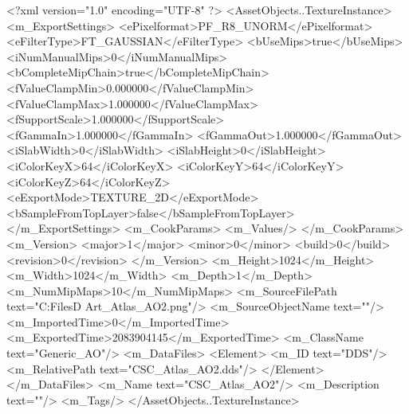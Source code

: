 <?xml version="1.0" encoding="UTF-8" ?>
<AssetObjects..TextureInstance>
	<m_ExportSettings>
		<ePixelformat>PF_R8_UNORM</ePixelformat>
		<eFilterType>FT_GAUSSIAN</eFilterType>
		<bUseMips>true</bUseMips>
		<iNumManualMips>0</iNumManualMips>
		<bCompleteMipChain>true</bCompleteMipChain>
		<fValueClampMin>0.000000</fValueClampMin>
		<fValueClampMax>1.000000</fValueClampMax>
		<fSupportScale>1.000000</fSupportScale>
		<fGammaIn>1.000000</fGammaIn>
		<fGammaOut>1.000000</fGammaOut>
		<iSlabWidth>0</iSlabWidth>
		<iSlabHeight>0</iSlabHeight>
		<iColorKeyX>64</iColorKeyX>
		<iColorKeyY>64</iColorKeyY>
		<iColorKeyZ>64</iColorKeyZ>
		<eExportMode>TEXTURE_2D</eExportMode>
		<bSampleFromTopLayer>false</bSampleFromTopLayer>
	</m_ExportSettings>
	<m_CookParams>
		<m_Values/>
	</m_CookParams>
	<m_Version>
		<major>1</major>
		<minor>0</minor>
		<build>0</build>
		<revision>0</revision>
	</m_Version>
	<m_Height>1024</m_Height>
	<m_Width>1024</m_Width>
	<m_Depth>1</m_Depth>
	<m_NumMipMaps>10</m_NumMipMaps>
	<m_SourceFilePath text="C:\Users\Shadow\Desktop\Working Files\3D Art\Textures\CSC_Atlas_AO2.png"/>
	<m_SourceObjectName text=""/>
	<m_ImportedTime>0</m_ImportedTime>
	<m_ExportedTime>2083904145</m_ExportedTime>
	<m_ClassName text="Generic_AO"/>
	<m_DataFiles>
		<Element>
			<m_ID text="DDS"/>
			<m_RelativePath text="CSC_Atlas_AO2.dds"/>
		</Element>
	</m_DataFiles>
	<m_Name text="CSC_Atlas_AO2"/>
	<m_Description text=""/>
	<m_Tags/>
</AssetObjects..TextureInstance>

